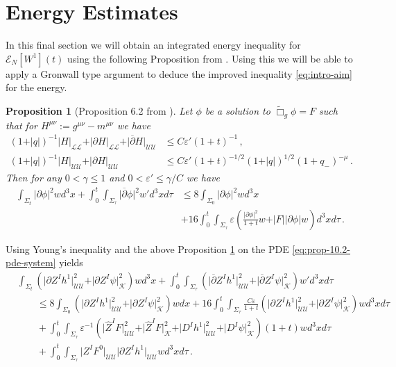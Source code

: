 \documentclass[11pt, a4paper]{amsart}
\numberwithin{equation}{section}
\newtheorem{proposition}[theorem]{Proposition}
\numberwithin{theorem}{section}
\newcommand{\p}{\partial}
\newcommand{\mn}{{\mu \nu}}
\newcommand{\pgood}{\overline{\partial}}
\newcommand{\tbox}{\widetilde{\Box}}
\newcommand{\UU}{{\mathcal{U} \mathcal{U}}}
\newcommand{\LL}{{\mathcal{L} \mathcal{L}}}
\newcommand{\K}{\mathcal{K}}
\newcommand{\qv}{\vert q \vert}
\begin{document}
\section{Energy Estimates} \label{section:energy}
In this final section we will obtain an integrated energy inequality for $\mathcal{E}_N[W^1](t)$ using the following Proposition from \cite{LR:04}. Using this we will be able to apply a Gronwall type argument to deduce the improved inequality \eqref{eq:intro-aim} for the energy. 
\begin{proposition}[Proposition 6.2 from \cite{LR:04}] \label{prop-6.2}
Let $\phi$ be a solution to $\tbox_g \phi = F$ such that for $H^\mn := g^\mn - m^\mn$ we have
\begin{equation}
\begin{split}
(1+\qv )^{-1} \vert H \vert_\LL + \vert \p H \vert_\LL + \vert \pgood H \vert_\UU &\leq C \varepsilon' (1+t)^{-1} \,, \\
(1+\qv )^{-1} \vert H \vert_\UU + \vert \p H \vert_\UU &\leq C \varepsilon' (1+t)^{-1/2} (1+\qv)^{1/2} (1+q_-)^{-\mu} \,.
\end{split} \label{eq:prop-6.2-decay-assump}
\end{equation}
Then for any $0 < \gamma \leq 1$ and $0 < \varepsilon' \leq \gamma/C$ we have
\begin{equation} \begin{split}
 \int_{\Sigma_t} \vert \p \phi \vert^2 w d^3 x + \int_0^t  \int_{\Sigma_\tau} \vert \pgood \phi \vert^2 w' d^3 x d \tau & \leq  8 \int_{\Sigma_0} \vert \p \phi \vert^2 w d^3 x \\ & +  16 \int_0^t  \int_{\Sigma_\tau} \varepsilon \left( \frac{\vert \p \phi \vert^2}{1+t} w + \vert F \vert \vert \p \phi \vert w \right) d^3 x d \tau \,. \end{split}
\end{equation}
\end{proposition}
Using Young's inequality and the above Proposition \ref{prop-6.2} on the PDE \eqref{eq:prop-10.2-pde-system} yields
\begin{equation} \begin{split}
& \int_{\Sigma_t }  \left(  \vert \p Z^I h^1 \vert^2_\UU + \vert  \p Z^I \psi \vert^2_\K \right) w d^3x  + \int_0^t \int_{\Sigma_\tau} \left( \vert \pgood Z^I h^1 \vert^2_\UU + \vert \pgood Z^I \psi \vert^2_\K \right) w' d^3 x d \tau \\
& \qquad \leq 8  \int_{\Sigma_0} \left( \vert \p Z^I h^1 \vert^2_\UU + \vert \p Z^I \psi \vert^2_\K \right) w dx + 16 \int_0^t \int_{\Sigma_\tau}  \frac{C \varepsilon}{1+t}  \left( \vert \p Z^I h^1 \vert^2_\UU + \vert \p Z^I \psi \vert^2_\K \right) w  d^3 x d \tau\\
& \qquad + \int_0^t \int_{\Sigma_\tau} \varepsilon^{-1} \left( \vert \hat{Z}^I F \vert^2_\UU + \vert \hat{Z}^I F \vert^2_\K + \vert D^I h^1 \vert^2_\UU + \vert D^I \psi \vert^2_\K  \right) (1+t)w d^3 x d \tau \\
& \qquad + \int_0^t \int_{\Sigma_\tau} \vert Z^I F^0 \vert_\UU \vert \p Z^I h^1 \vert_\UU  w   d^3 x d \tau \,.
\label{eq:prop7.1-energy-W} \end{split} \end{equation}
\end{document}
